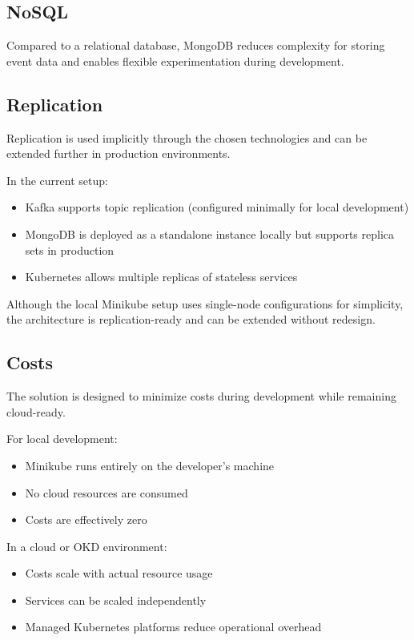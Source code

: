 \documentclass[12pt,a4paper,onecolumn,twoside]{tau-class/tau}
\begin{document}
\subsection{NoSQL}

Compared to a relational database, MongoDB reduces complexity for storing event data and enables flexible experimentation during development.

\subsection{Replication}

Replication is used implicitly through the chosen technologies and can be extended further in production environments.

In the current setup:

\begin{itemize}
    \item Kafka supports topic replication (configured minimally for local development)
    \item MongoDB is deployed as a standalone instance locally but supports replica sets in production
    \item Kubernetes allows multiple replicas of stateless services
\end{itemize}

Although the local Minikube setup uses single-node configurations for simplicity, the architecture is replication-ready and can be extended without redesign.

\subsection{Costs}

The solution is designed to minimize costs during development while remaining cloud-ready.

For local development:

\begin{itemize}
    \item Minikube runs entirely on the developer's machine
    \item No cloud resources are consumed
    \item Costs are effectively zero
\end{itemize}

In a cloud or OKD environment:

\begin{itemize}
    \item Costs scale with actual resource usage
    \item Services can be scaled independently
    \item Managed Kubernetes platforms reduce operational overhead
\end{itemize}
\end{document}
